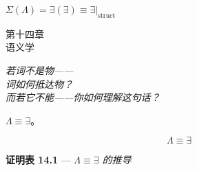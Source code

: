 \documentclass[10pt, openany, oneside]{book}
\renewcommand{\large}{\fontsize{11.5}{14}\selectfont}
\renewcommand{\huge}{\fontsize{17}{21}\selectfont}
\begin{document}
\vspace{0.5em}

\begin{center}
    $\Sigma(\Lambda) = \exists(\exists) \equiv \exists|_{\text{struct}}$
\end{center}


%
%
%

\newpage

\begin{center}
    {\huge\scshape 第十四章}\\[0.3em]
    {\large\scshape 语义学}
\end{center}

\vspace{1.5em}

\begin{center}
    \itshape
    若词不是物——\\
    词如何抵达物？\\
    而若它不能——你如何理解这句话？
\end{center}

\vspace{2em}


\noindent $\Lambda \equiv \exists$。

$$\boxed{\Lambda \equiv \exists}$$

\vspace{0.5em}

\textbf{证明表 14.1} --- \textit{$\Lambda \equiv \exists$ 的推导}

\vspace{0.5em}
\end{document}
